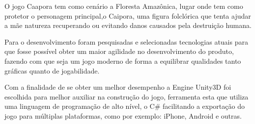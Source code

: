 O jogo Caapora tem como cenário a Floresta Amazônica, lugar onde tem como protetor o personagem principal,o Caipora, uma figura folclórica que tenta ajudar a mãe natureza recuperando ou evitando danos causados pela destruição humana.

Para o desenvolvimento foram pesquisadas e selecionadas tecnologias atuais para que fosse possível obter um maior agilidade no desenvolvimento do produto, fazendo com que seja um jogo moderno de forma a equilibrar qualidades tanto gráficas quanto de jogabilidade. 

Com a finalidade de se obter um melhor desempenho a Engine Unity3D foi escolhida para melhor auxiliar na construção do jogo, ferramenta esta que utiliza uma linguagem de programação de alto nível, o C\# facilitando a exportação do jogo para múltiplas plataformas, como por exemplo: iPhone, Android e outras.

